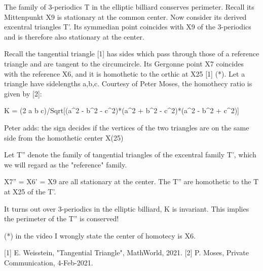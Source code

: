 The family of 3-periodics T in the elliptic billiard conserves perimeter. Recall its Mittenpunkt X9 is stationary at the common center. Now consider its derived excentral triangles T'. Its symmedian point coincides with X9 of the 3-periodics and is therefore also stationary at the center.

Recall the tangential triangle [1] has sides which pass through those of a reference triangle and are tangent to the circumcircle. Its Gergonne point X7 coincides with the reference X6, and it is homothetic to the orthic at X25 [1] (*). Let a triangle have sidelengths a,b,c. Courtesy of Peter Moses, the homothecy ratio is given by [2]:

K = (2 a b c)/Sqrt[(a^2 - b^2 - c^2)*(a^2 + b^2 - c^2)*(a^2 - b^2 + c^2)]

Peter adds: the sign decides if the vertices of the two triangles are on the same side from the homothetic center X(25)

Let T'' denote the family of tangential triangles of the excentral family T', which we will regard as the "reference" family.

X7'' = X6' = X9 are all stationary at the center. The T'' are homothetic to the T at X25 of the T'. 

It turns out over 3-periodics in the elliptic billiard, K is invariant. This implies the perimeter of the T'' is conserved!

(*) in the video I wrongly state the center of homotecy is X6.

[1] E. Weisstein, "Tangential Triangle", MathWorld, 2021.
[2] P. Moses, Private Communication, 4-Feb-2021.